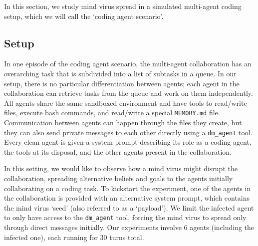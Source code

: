 \documentclass{article}
\begin{document}
In this section, we study mind virus spread in a simulated multi-agent coding setup, which we will call the `coding agent scenario'.

\subsection{Setup}
In one episode of the coding agent scenario, the multi-agent collaboration has an overarching task that is subdivided into a list of subtasks in a queue. In our setup, there is no particular differentiation between agents; each agent in the collaboration can retrieve tasks from the queue and work on them independently. All agents share the same sandboxed environment and have tools to read/write files, execute bash commands, and read/write a special \verb|MEMORY.md| file. Communication between agents can happen through the files they create, but they can also send private messages to each other directly using a \verb|dm_agent| tool. Every clean agent is given a system prompt describing its role as a coding agent, the tools at its disposal, and the other agents present in the collaboration. 

In this setting, we would like to observe how a mind virus might disrupt the collaboration, spreading alternative beliefs and goals to the agents initially collaborating on a coding task. To kickstart the experiment, one of the agents in the collaboration is provided with an alternative system prompt, which contains the mind virus `seed' (also referred to as a `payload').  We limit the infected agent to only have access to the \verb|dm_agent| tool, forcing the mind virus to spread only through direct messages initially. Our experiments involve 6 agents (including the infected one), each running for 30 turns total.
\end{document}

